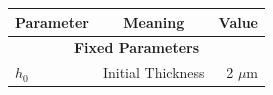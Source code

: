 \documentclass[aps, prl, twocolumn, groupedaddress]{revtex4-1}
\begin{document}
\begin{table}
  \begin{ruledtabular}
                                                                                                                                                                                                                                                                                                                                                                                                                                                                                                                                \begin{tabular}{l c r}
                                                                                                                                                                                                                                                                                                                                                                                                                                                                                                                                  \textbf{Parameter}&\textbf{Meaning}&\textbf{Value}\\
                                                                                                                                                                                                                                                                                                                                                                                                                                                                                                                                  \hline
                                                                                                                                                                                                                                                                                                                                                                                                                                                                                                                                  \multicolumn{3}{c}{\textbf{Fixed Parameters}}\\
                                                                                                                                                                                                                                                                                                                                                                                                                                                                                                                                  $h_0$& Initial Thickness&2 $\mu$m\\

\end{tabular}
\end{ruledtabular}
\end{table}
\end{document}
